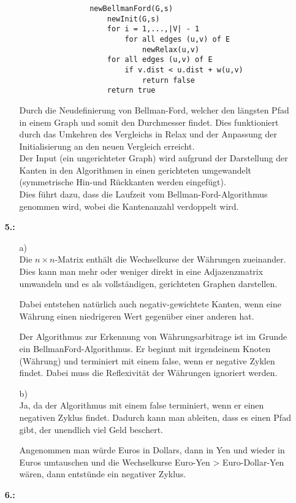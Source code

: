 \documentclass[a4paper,11pt,fleqn]{scrartcl}
\begin{document}
\begin{enumerate}
\begin{enumerate}
\begin{verbatim}
				newBellmanFord(G,s)
				    newInit(G,s)
				    for i = 1,...,|V| - 1
				        for all edges (u,v) of E
				            newRelax(u,v)
				    for all edges (u,v) of E
				        if v.dist < u.dist + w(u,v)
				            return false
				    return true
				\end{verbatim}
				Durch die Neudefinierung von Bellman-Ford, welcher den längsten Pfad in einem Graph und somit 
				den Durchmesser findet. Dies funktioniert durch das Umkehren des Vergleichs in Relax und der 
				Anpassung der Initialisierung an den neuen Vergleich erreicht. \\
				Der Input (ein ungerichteter Graph) wird aufgrund der Darstellung der Kanten in den Algorithmen
				in einen gerichteten umgewandelt (symmetrische Hin-und Rückkanten werden eingefügt). \\
				Dies führt dazu, dass die Laufzeit vom Bellman-Ford-Algorithmus genommen wird, wobei die 
				Kantenanzahl verdoppelt wird.
		\end{enumerate}
		\item[\textbf{5.:}]
		\begin{enumerate}
			\item[a)] \quad \\
			    Die $n \times n$-Matrix enthält die Wechselkurse der Währungen zueinander. Dies kann man mehr oder weniger direkt in eine Adjazenzmatrix umwandeln und es als vollständigen, gerichteten Graphen darstellen.
			    
			    Dabei entstehen natürlich auch negativ-gewichtete Kanten, wenn eine Währung einen niedrigeren Wert gegenüber einer anderen hat.
			    
			    Der Algorithmus zur Erkennung von Währungsarbitrage ist im Grunde ein BellmanFord-Algorithmus. Er beginnt mit irgendeinem Knoten (Währung) und terminiert mit einem false, wenn er negative Zyklen findet. Dabei muss die Reflexivität der Währungen ignoriert werden.
			\item[b)] \quad \\
				Ja, da der Algorithmus mit einem false terminiert, wenn er einen negativen Zyklus findet. Dadurch kann man ableiten, dass es einen Pfad gibt, der unendlich viel Geld beschert.
				
                Angenommen man würde Euros in Dollars, dann in Yen und wieder in Euros umtauschen und die Wechselkurse Euro-Yen > Euro-Dollar-Yen wären, dann entstünde ein negativer Zyklus.
		\end{enumerate}
		\item[\textbf{6.:}] \quad \\
			\todo
	\end{enumerate}
\end{document}
